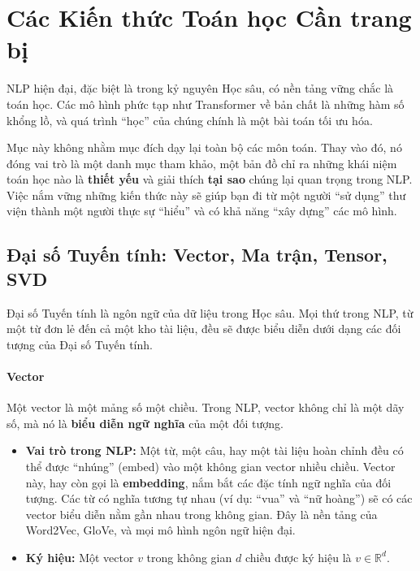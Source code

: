 
\section{Các Kiến thức Toán học Cần trang bị}
\label{sec:kien_thuc_toan_hoc}

NLP hiện đại, đặc biệt là trong kỷ nguyên Học sâu, có nền tảng vững chắc là toán học. Các mô hình phức tạp như Transformer về bản chất là những hàm số khổng lồ, và quá trình “học” của chúng chính là một bài toán tối ưu hóa.

Mục này không nhằm mục đích dạy lại toàn bộ các môn toán. Thay vào đó, nó đóng vai trò là một danh mục tham khảo, một bản đồ chỉ ra những khái niệm toán học nào là \textbf{thiết yếu} và giải thích \textbf{tại sao} chúng lại quan trọng trong NLP. Việc nắm vững những kiến thức này sẽ giúp bạn đi từ một người “sử dụng” thư viện thành một người thực sự “hiểu” và có khả năng “xây dựng” các mô hình.

\subsection{Đại số Tuyến tính: Vector, Ma trận, Tensor, SVD}
\label{ssec:dai_so_tuyen_tinh}
Đại số Tuyến tính là ngôn ngữ của dữ liệu trong Học sâu. Mọi thứ trong NLP, từ một từ đơn lẻ đến cả một kho tài liệu, đều sẽ được biểu diễn dưới dạng các đối tượng của Đại số Tuyến tính.

\paragraph{Vector}
Một vector là một mảng số một chiều. Trong NLP, vector không chỉ là một dãy số, mà nó là \textbf{biểu diễn ngữ nghĩa} của một đối tượng.
\begin{itemize}
    \item \textbf{Vai trò trong NLP:} Một từ, một câu, hay một tài liệu hoàn chỉnh đều có thể được “nhúng” (embed) vào một không gian vector nhiều chiều. Vector này, hay còn gọi là \textbf{embedding}, nắm bắt các đặc tính ngữ nghĩa của đối tượng. Các từ có nghĩa tương tự nhau (ví dụ: “vua” và “nữ hoàng”) sẽ có các vector biểu diễn nằm gần nhau trong không gian. Đây là nền tảng của Word2Vec, GloVe, và mọi mô hình ngôn ngữ hiện đại.
    \item \textbf{Ký hiệu:} Một vector $v$ trong không gian $d$ chiều được ký hiệu là $v \in \mathbb{R}^d$.
\end{itemize}

